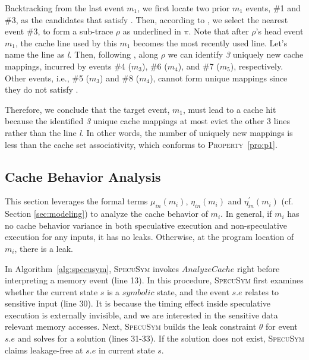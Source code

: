 \documentclass[sigconf]{acmart}
\newcommand*\circled[1]{\tikz[baseline=(char.base)]{
				\node[shape=circle,draw,inner sep=1pt] (char) {\scriptsize{#1}};}}
\newcommand{\SpecuSym}{\textsc{SpecuSym} }
\begin{document}
Backtracking from the last event $\mathit{m_1}$, we first locate two prior 
$\mathit{m_1}$ events, \#1 and \#3, as the candidates that satisfy \circled{4}. 
Then, according to \circled{5}, we select the nearest event \#3, to form a 
sub-trace $\rho$ as underlined in $\pi$. Note that after $\rho$'s head event 
$\mathit{m_1}$, the cache line used by this $\mathit{m_1}$ becomes the most 
recently used line. Let's name the line as \emph{l}. Then, following \circled{6}, 
along $\rho$ we can identify \emph{3} uniquely new cache mappings, incurred by 
events \#4 ($\mathit{m_3}$), \#6 ($\mathit{m_4}$), and \#7 ($\mathit{m_5}$), 
respectively. Other events, i.e., \#5 ($\mathit{m_3}$) and \#8 ($\mathit{m_4}$),
cannot form unique mappings since they do not satisfy \circled{6}.


Therefore, we conclude that the target event, $\mathit{m_1}$, must lead to a 
cache hit because the identified \emph{3} unique cache mappings at most evict 
the other 3 lines rather than the line \emph{l}. In other words, the number of 
uniquely new mappings is less than the cache set associativity, which conforms 
to \textsc{Property}~\ref{pro:p1}.


\subsection{Cache Behavior Analysis}
\label{sec:analysis}

This section leverages the formal terms $\mathit{\mu_{in}(m_i)}$, 
$\mathit{\eta_{in}(m_i)}$ and $\mathit{\eta^\prime_{in}(m_i)}$ (cf. Section
\ref{sec:modeling}) to analyze the cache behavior of $\mathit{m_i}$. In general, 
if $\mathit{m_i}$ has no cache behavior variance in both speculative execution 
and non-speculative execution for any inputs, it has no leaks. Otherwise, at the 
program location of $\mathit{m_i}$, there is a leak. 



In Algorithm~\ref{alg:specusym}, \SpecuSym invokes $\mathit{AnalyzeCache}$ right
before interpreting a memory event (line 13). In this procedure, \SpecuSym first 
examines whether the current state $s$ is a $\mathit{symbolic}$ state, and the 
event $s.e$ relates to sensitive input (line 30). It is because the timing effect 
inside speculative execution is externally invisible, and we are interested in the 
sensitive data relevant memory accesses. Next, \SpecuSym builds the leak constraint 
$\theta$ for event $s.e$ and solves for a solution (lines 31-33). If the solution
does not exist, \SpecuSym claims leakage-free at $s.e$ in current state $s$.
\end{document}
